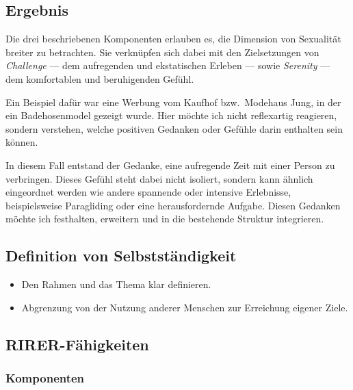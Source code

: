 \subsection{Ergebnis}

Die drei beschriebenen Komponenten erlauben es, die Dimension von Sexualität breiter zu betrachten. Sie verknüpfen sich dabei mit den Zielsetzungen von \textit{Challenge} --- dem aufregenden und ekstatischen Erleben --- sowie \textit{Serenity} --- dem komfortablen und beruhigenden Gefühl.

Ein Beispiel dafür war eine Werbung vom Kaufhof bzw.\ Modehaus Jung, in der ein Badehosenmodel gezeigt wurde. Hier möchte ich nicht reflexartig reagieren, sondern verstehen, welche positiven Gedanken oder Gefühle darin enthalten sein können. 

In diesem Fall entstand der Gedanke, eine aufregende Zeit mit einer Person zu verbringen. Dieses Gefühl steht dabei nicht isoliert, sondern kann ähnlich eingeordnet werden wie andere spannende oder intensive Erlebnisse, beispielsweise Paragliding oder eine herausfordernde Aufgabe. Diesen Gedanken möchte ich festhalten, erweitern und in die bestehende Struktur integrieren.

\subsection{Definition von Selbstständigkeit}

\begin{itemize}
    \item Den Rahmen und das Thema klar definieren.
    \item Abgrenzung von der Nutzung anderer Menschen zur Erreichung eigener Ziele.
\end{itemize}

\subsection{RIRER-Fähigkeiten}

\subsubsection{Komponenten}

